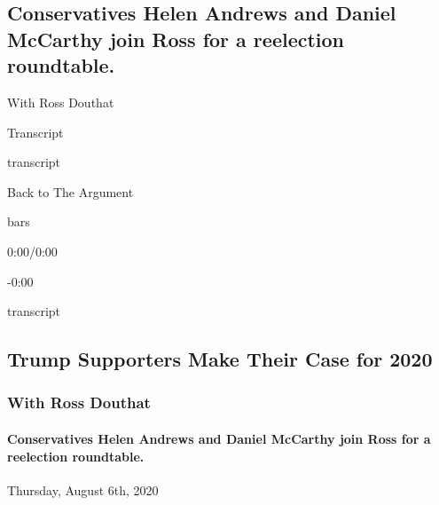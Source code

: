 \hypertarget{conservatives-helen-andrews-and-daniel-mccarthy-join-ross-for-a-reelection-roundtable-1}{%
\subsection{Conservatives Helen Andrews and Daniel McCarthy join Ross
for a reelection
roundtable.}\label{conservatives-helen-andrews-and-daniel-mccarthy-join-ross-for-a-reelection-roundtable-1}}

With Ross Douthat

Transcript

transcript

Back to The Argument

bars

0:00/0:00

-0:00

transcript

\hypertarget{trump-supporters-make-their-case-for-2020-2}{%
\subsection{Trump Supporters Make Their Case for
2020}\label{trump-supporters-make-their-case-for-2020-2}}

\hypertarget{with-ross-douthat-1}{%
\subsubsection{With Ross Douthat}\label{with-ross-douthat-1}}

\hypertarget{conservatives-helen-andrews-and-daniel-mccarthy-join-ross-for-a-reelection-roundtable-2}{%
\paragraph{Conservatives Helen Andrews and Daniel McCarthy join Ross for
a reelection
roundtable.}\label{conservatives-helen-andrews-and-daniel-mccarthy-join-ross-for-a-reelection-roundtable-2}}

Thursday, August 6th, 2020

